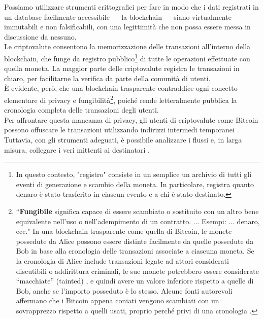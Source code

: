 Possiamo utilizzare strumenti crittografici per fare in modo che i dati registrati in un database facilmente accessibile — la blockchain — siano virtualmente immutabili e non falsificabili, con una legittimità che non possa essere messa in discussione da nessuno.
\\ \newline
Le criptovalute consentono la memorizzazione delle transazioni all’interno della blockchain, che funge da registro pubblico\footnote{In questo contesto, "registro" consiste in un semplice un archivio di tutti gli eventi di generazione e scambio della moneta. In particolare, registra quanto denaro è stato trasferito in ciascun evento e a chi è stato destinato.} di tutte le operazioni effettuate con quella moneta. La maggior parte delle criptovalute registra le transazioni in chiaro, per facilitarne la verifica da parte della comunità di utenti.
\\ \newline
È evidente, però, che una blockchain trasparente contraddice ogni concetto elementare di privacy e fungibilità\footnote{``\textbf{Fungibile} significa capace di essere scambiato o sostituito con un altro bene equivalente nell’uso o nell’adempimento di un contratto. ... Esempi: ... denaro, ecc."\cite{mises-org-fungible} In una blockchain trasparente come quella di Bitcoin, le monete possedute da Alice possono essere distinte facilmente da quelle possedute da Bob in base alla cronologia delle transazioni associate a ciascuna moneta.
Se la cronologia di Alice include transazioni legate ad attori considerati discutibili o addirittura criminali, le sue monete potrebbero essere considerate “macchiate” (tainted) \cite{bitcoin-big-bang-taint}, e quindi avere un valore inferiore rispetto a quelle di Bob, anche se l’importo posseduto è lo stesso.
Alcune fonti autorevoli affermano che i Bitcoin appena coniati vengono scambiati con un sovrapprezzo rispetto a quelli usati, proprio perché privi di una cronologia \cite{new-bitcoin-premium}.}, poiché rende letteralmente pubblica la cronologia completa delle transazioni degli utenti.
\\ \newline
Per affrontare questa mancanza di privacy, gli utenti di criptovalute come Bitcoin possono offuscare le transazioni utilizzando indirizzi intermedi temporanei \cite{DBLP:journals/corr/NarayananM17}. Tuttavia, con gli strumenti adeguati, è possibile analizzare i flussi e, in larga misura, collegare i veri mittenti ai destinatari \cite{DBLP:journals/corr/ShenTuY15b, DK-police-tracing-btc, Andrew-Cox-Sandia, chainalysis-2020-report}.

